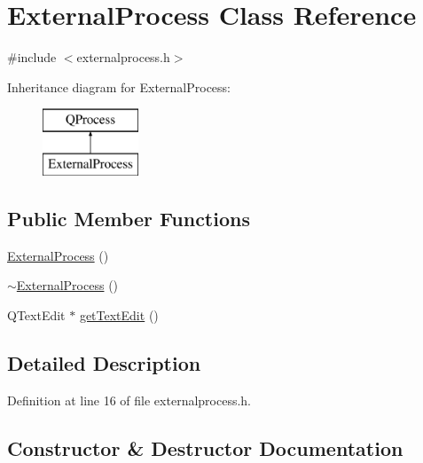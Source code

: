 \hypertarget{class_external_process}{}\section{External\+Process Class Reference}
\label{class_external_process}


{\ttfamily \#include $<$externalprocess.\+h$>$}

Inheritance diagram for External\+Process\+:\begin{figure}[H]
\begin{center}
\leavevmode
\includegraphics[height=2.000000cm]{class_external_process}
\end{center}
\end{figure}
\subsection*{Public Member Functions}
\begin{DoxyCompactItemize}
\item 
\mbox{\hyperlink{class_external_process_a292edbb2ed700c4cc90c0d0f96c76d90}{External\+Process}} ()
\item 
\mbox{\hyperlink{class_external_process_aa80ad7b73431a46448382049e8fd39db}{$\sim$\+External\+Process}} ()
\item 
Q\+Text\+Edit $\ast$ \mbox{\hyperlink{class_external_process_a7f5259ee1ed3094cff299dae5fd8d557}{get\+Text\+Edit}} ()
\end{DoxyCompactItemize}


\subsection{Detailed Description}


Definition at line 16 of file externalprocess.\+h.



\subsection{Constructor \& Destructor Documentation}
\mbox{\label{class_external_process_a292edbb2ed700c4cc90c0d0f96c76d90}} 
